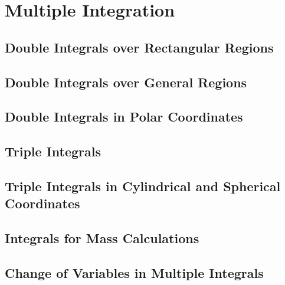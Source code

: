 \documentclass[../calc3.tex]{subfiles}
\begin{document}
\chapter{Multiple Integration}
\section{Double Integrals over Rectangular Regions}
\section{Double Integrals over General Regions}
\section{Double Integrals in Polar Coordinates}
\section{Triple Integrals}
\section{Triple Integrals in Cylindrical and Spherical Coordinates}
\section{Integrals for Mass Calculations}
\section{Change of Variables in Multiple Integrals}
\end{document}
